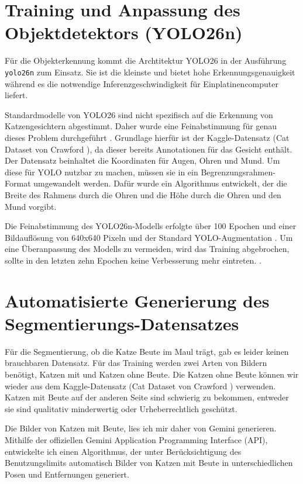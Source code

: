 \section{Training und Anpassung des Objektdetektors (YOLO26n)}
Für die Objekterkennung kommt die Archtitektur YOLO26 in der Ausführung \texttt{yolo26n} zum Einsatz. Sie ist die kleinste und bietet hohe Erkennungsgenauigkeit während es die notwendige Inferenzgeschwindigkeit für Einplatinencomputer liefert.

Standardmodelle von YOLO26 sind nicht spezifisch auf die Erkennung von Katzengesichtern abgestimmt. Daher wurde eine Feinabstimmung für genau dieses Problem durchgeführt \cite{yosinski2014transferable}. Grundlage hierfür ist der Kaggle-Datensatz (Cat Dataset von Crawford \cite{kaggle2024cat}), da dieser bereits Annotationen für das Gesicht enthält. Der Datensatz beinhaltet die Koordinaten für Augen, Ohren und Mund. Um diese für YOLO nutzbar zu machen, müssen sie in ein Begrenzungsrahmen-Format umgewandelt werden. Dafür wurde ein Algorithmus entwickelt, der die Breite des Rahmens durch die Ohren und die Höhe durch die Ohren und den Mund vorgibt.

Die Feinabstimmung des YOLO26n-Modells erfolgte über 100 Epochen und einer Bildauflösung von 640x640 Pixeln und der Standard YOLO-Augmentation \cite{ultralytics_augmentation}. Um eine Überanpassung des Modells zu vermeiden, wird das Training abgebrochen, sollte in den letzten zehn Epochen keine Verbesserung mehr eintreten. \cite{goodfellow2016deep}.

\section{Automatisierte Generierung des Segmentierungs-Datensatzes}
Für die Segmentierung, ob die Katze Beute im Maul trägt, gab es leider keinen brauchbaren Datensatz. Für das Training werden zwei Arten von Bildern benötigt, Katzen mit und Katzen ohne Beute. Die Katzen ohne Beute können wir wieder aus dem Kaggle-Datensatz (Cat Dataset von Crawford \cite{kaggle2024cat}) verwenden. Katzen mit Beute auf der anderen Seite sind schwierig zu bekommen, entweder sie sind qualitativ minderwertig oder Urheberrechtlich geschützt. 

Die Bilder von Katzen mit Beute, lies ich mir daher von Gemini \cite{geminiteam2023gemini} generieren. Mithilfe der offiziellen Gemini Application Programming Interface (API), entwickelte ich einen Algorithmus, der unter Berücksichtigung des Benutzungslimits automatisch Bilder von Katzen mit Beute in unterschiedlichen Posen und Entfernungen generiert.

